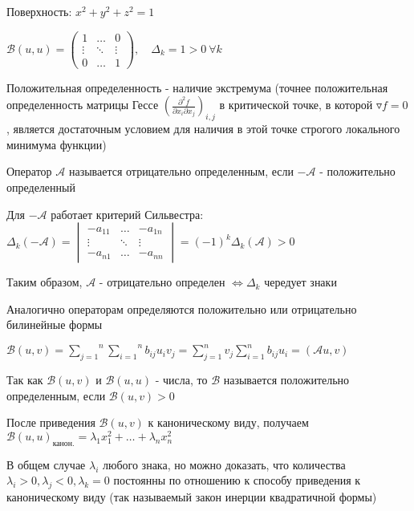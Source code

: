 \documentclass[12pt]{article}
\begin{document}
    \Ex Поверхность: $x^2 + y^2 + z^2 = 1$

    $\mathcal{B}(u, u) = \begin{pmatrix}1 & \dots & 0 \\ \vdots & \ddots & \vdots \\ 0 & \dots & 1\end{pmatrix},
    \quad \Delta_k = 1 > 0 \ \forall k$

    Положительная определенность - наличие экстремума (точнее положительная определенность матрицы Гессе $\left(\frac{\partial^2 f}{\partial x_i \partial x_j}\right)_{i,j}$ в критической точке, в которой $\triangledown f = 0$, является достаточным условием для наличия в этой точке строгого локального минимума функции)

    \Def Оператор $\mathcal{A}$ называется отрицательно определенным, если $-\mathcal{A}$ - положительно определенный

    \Notas Для $-\mathcal{A}$ работает критерий Сильвестра: $\Delta_k(-\mathcal{A}) =
    \begin{vmatrix}-a_{11} & \dots & -a_{1n} \\ \vdots & \ddots & \vdots \\ -a_{n1} & \dots & -a_{nn}\end{vmatrix} = (-1)^k \Delta_k (\mathcal{A}) > 0$

    Таким образом, $\mathcal{A}$ - отрицательно определен $\Longleftrightarrow \Delta_k$ чередует знаки

    \Nota Аналогично операторам определяются положительно или отрицательно билинейные формы

    $\mathcal{B}(u, v) = \overset{n}{\underset{j = 1}{\sum}}\overset{n}{\underset{i = 1}{\sum}} b_{ij} u_i v_j = \sum_{j = 1}^n v_j \sum_{i = 1}^n b_{ij} u_i = (\mathcal{A} u, v)$

    Так как $\mathcal{B}(u, v)$ и  $\mathcal{B}(u, u)$ - числа, то $\mathcal{B}$ называется положительно определенным, если $\mathcal{B}(u, v) > 0$

    \Nota После приведения $\mathcal{B}(u, v)$ к каноническому виду, получаем $\mathcal{B}(u, u)_{\text{канон.}} = \lambda_1 x_1^2 + \dots + \lambda_n x_n^2$

    В общем случае $\lambda_i$ любого знака, но можно доказать, что количества $\lambda_i > 0, \lambda_j < 0, \lambda_k = 0$ постоянны по отношению к способу приведения
    к каноническому виду (так называемый закон инерции квадратичной формы)
\end{document}
